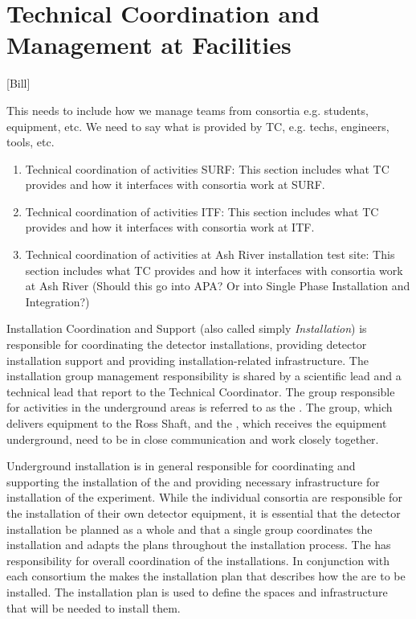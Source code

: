 \chapter{Technical Coordination and Management at Facilities}
\label{vl:tc-facility_mgmt}

[Bill]

This needs to include how we manage teams from consortia
e.g. students, equipment, etc. We need to say what is provided by TC,
e.g. techs, engineers, tools, etc.
\begin{enumerate}
 \item Technical coordination of activities SURF: This section includes what TC provides and how it interfaces with consortia work at SURF.
 \item Technical coordination of activities ITF: This section includes what TC provides and how it interfaces with consortia work at ITF.
 \item Technical coordination of activities at Ash River installation
   test site: This section includes what TC provides and how it
   interfaces with consortia work at Ash River (Should this go into
   APA? Or into Single Phase Installation and Integration?)
\end{enumerate}

Installation Coordination and Support (also called simply
\textit{Installation}) is responsible for coordinating the detector
installations, providing detector installation support and providing
installation-related infrastructure. The installation group management
responsibility is shared by a scientific lead and a technical lead
that report to the Technical Coordinator. The group responsible for
activities in the underground areas is referred to as the
. The  group, which delivers equipment to the
Ross Shaft, and the , which receives the equipment
underground, need to be in close communication and work closely
together.

Underground installation is in general responsible for coordinating
and supporting the installation of the  and
providing necessary infrastructure for installation of the
experiment. While the individual consortia are responsible for the
installation of their own detector equipment, it is essential that the
detector installation be planned as a whole and that a single group
coordinates the installation and adapts the plans throughout the
installation process. The  has responsibility for overall
coordination of the installations. In conjunction with each consortium
the  makes the installation plan that describes how the
 are to be installed. The installation plan is used
to define the spaces and infrastructure that will be needed to install
them.

